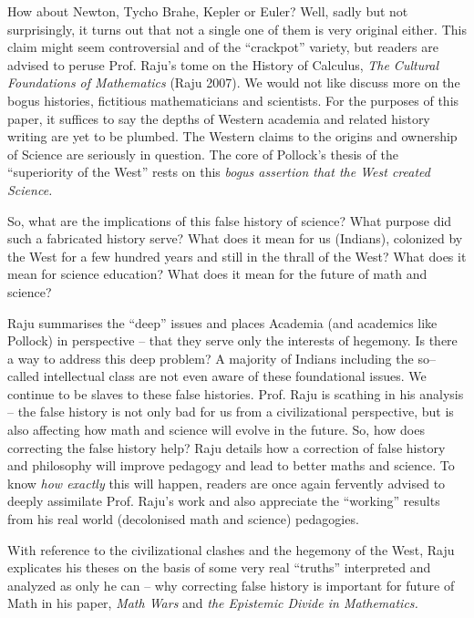 How about Newton, Tycho Brahe, Kepler or Euler? Well, sadly but not surprisingly, it turns out that not a single one of them is very original either. This claim might seem controversial and of the “crackpot” variety, but readers are advised to peruse Prof. Raju’s tome on the History of Calculus, \textit{The Cultural Foundations of Mathematics} (Raju 2007). We would not like discuss more on the bogus histories, fictitious mathematicians and scientists. For the purposes of this paper, it suffices to say the depths of Western academia and related history writing are yet to be plumbed. The Western claims to the origins and ownership of Science are seriously in question. The core of Pollock’s thesis of the “superiority of the West” rests on this \textit{bogus assertion that the West created Science.}

So, what are the implications of this false history of science? What purpose did such a fabricated history serve? What does it mean for us (Indians), colonized by the West for a few hundred years and still in the thrall of the West? What does it mean for science education? What does it mean for the future of math and science?

Raju summarises the “deep” issues and places Academia (and academics like Pollock) in perspective – that they serve only the interests of hegemony. Is there a way to address this deep problem? A majority of Indians including the so–called intellectual class are not even aware of these foundational issues. We continue to be slaves to these false histories. Prof. Raju is scathing in his analysis – the false history is not only bad for us from a civilizational perspective, but is also affecting how math and science will evolve in the future. So, how does correcting the false history help? Raju details how a correction of false history and philosophy will improve pedagogy and lead to better maths and science. To know \textit{how exactly} this will happen, readers are once again fervently advised to deeply assimilate Prof. Raju’s work and also appreciate the “working” results from his real world (decolonised math and science) pedagogies.

With reference to the civilizational clashes and the hegemony of the West, Raju explicates his theses on the basis of some very real “truths” interpreted and analyzed as only he can – why correcting false history is important for future of Math in his paper, \textit{Math Wars} and \textit{the Epistemic Divide in Mathematics.}

